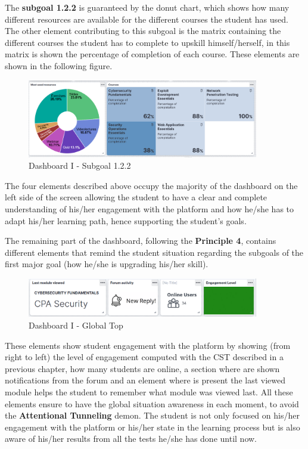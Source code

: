 The \textbf{subgoal 1.2.2} is guaranteed by the donut chart, which shows how many
different resources are available for the different courses the student has
used. The other element contributing to this subgoal is the matrix containing
the different courses the student has to complete to upskill himself/herself,
in this matrix is shown the percentage of completion of each course. These elements
are shown in the following figure.

\begin{figure}[H]
    \centering
    \includegraphics[width=0.9\textwidth]{assets/dashboard_1_122.png}
    \caption{Dashboard I - Subgoal 1.2.2}
    \label{fig:dashboard_1_subgoal_122}
\end{figure}

The four elements described above occupy the majority of the dashboard on 
the left side of the screen allowing the student to have a clear and complete
understanding of his/her engagement with the platform and how he/she has to
adapt his/her learning path, hence supporting the student's goals. 

The remaining part of the dashboard, following the
\textbf{Principle 4}, contains different elements that remind the student
situation regarding the subgoals of the first major goal (how he/she is upgrading 
his/her skill). 

\begin{figure}[H]
    \centering
    \includegraphics[width=0.9\textwidth]{assets/dashboard_1_globaltop.png}
    \caption{Dashboard I - Global Top}
    \label{fig:dashboard_1_global_top}
\end{figure}

These elements show student engagement with the platform by showing (from right to left)
the level of engagement computed with the CST described in a previous chapter,
how many students are online, a section
where are shown notifications from the forum 
and an element where is present the last viewed module helps the student
to remember what module was viewed last.
All these elements ensure to have the global situation awareness in each moment, 
to avoid the \textbf{Attentional Tunneling} demon. The student is not only focused
on his/her engagement with the platform or his/her state in the learning process but is
also aware of his/her results from all the tests he/she has done until now.

